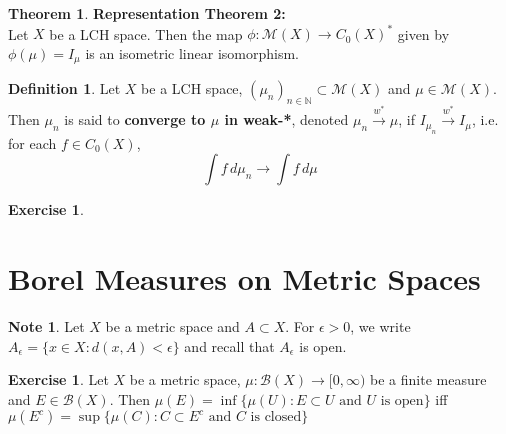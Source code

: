 \documentclass{book}
\theoremstyle{definition}
\newtheorem{defn}[definition]{Definition}
\newtheorem{note}[definition]{Note}
\newtheorem{thm}[definition]{Theorem}
\newtheorem{ex}[definition]{Exercise}
\newcommand{\ep}{\epsilon}
\newcommand{\N}{\mathbb{N}}
\newcommand{\MB}{\mathcal{B}}
\newcommand{\MM}{\mathcal{M}}
\newcommand{\lex}[1]{\label{ex:#1}}
\newcommand{\ld}[1]{\label{defn:#1}}
\DeclareMathOperator*{\0}{\mbf{0}}
\DeclareMathOperator*{\1}{\mbf{1}}
\newcommand{\conv}[1]{\xrightarrow{#1}}
\newcommand{\Rg}{[0,\infty)}
\newcommand{\dmu}{\, d \mu}
\begin{document}
	\begin{thm}\textbf{Representation Theorem 2:}\\
	Let $X$ be a LCH space. Then the map $\phi: \MM(X) \rightarrow C_0(X)^*$ given by $\phi(\mu) = I_{\mu}$ is an isometric linear isomorphism. 
	\end{thm}
	
	
	
	
	\begin{defn} \ld{00000} 
	Let $X$ be a LCH space, $(\mu_n)_{n \in \N} \subset \MM(X)$ and $\mu \in \MM(X)$. Then $\mu_n$ is said to  \textbf{converge to $\mu$ in weak-*}, denoted $\mu_n \conv{w^*}\mu$, if $I_{\mu_n} \conv{w^*} I_{\mu}$, i.e. for each $f \in C_0(X)$, $$\int f \dmu_n \rightarrow \int f \dmu$$
	\end{defn}
	
	\begin{ex} \lex{00000} 
	
	\end{ex}
	
	
	
	
	
	
	
	
	
	

	
	
	
	
	
	
	
	
	
	
	
	
	\newpage
	\section{Borel Measures on Metric Spaces}
	\begin{note}
		Let $X$ be a metric space and $A \subset X$. For $\ep >0$, we write $A_{\ep} = \{x \in X: d(x, A) < \ep\}$ and recall that $A_{\ep}$ is open.
	\end{note}

	\begin{ex}
		Let $X$ be a metric space, $\mu: \MB(X) \rightarrow \Rg$ be a finite measure and $E \in \MB(X)$. Then 
		$\mu(E) = \inf  \{\mu(U): E \subset U \text{ and $U$ is open} \}$ iff $\mu(E^c) = \sup  \{\mu(C): C \subset E^c \text{ and $C$ is closed} \}$ 
	\end{ex}
\end{document}

